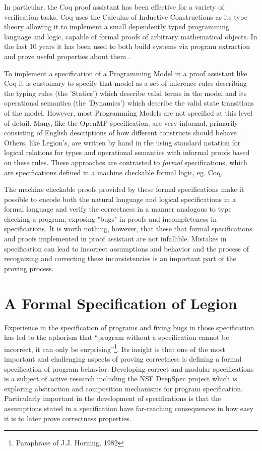 \documentclass[sigconf]{acmart}
\begin{document}
In particular, the Coq proof assistant has been effective for a variety of
verification tasks. Coq uses the Calculus of Inductive Constructions as its type 
theory allowing it to implement
a small dependently typed programming language and logic, capable of  
formal proofs of arbitrary mathematical objects\cite{bertot2013interactive}. In the last 10
years it has been used to both build systems via program extraction and prove
useful properties about them \cite{leroy2012compcert, anand2017certicoq,
chlipala2009effective}. 

To implement a specification of a Programming Model in a proof assistant like
Coq it is customary to specify that model as a set of inference rules describing
the typing rules (the 'Statics') which describe valid terms in the model and its
operational semantics (the 'Dynamics') which describe the valid state
transitions of the model. However, most Programming Models are not specified at
this level of detail. Many, like the OpenMP
specification, are very informal, primarily consisting of English descriptions
of how different constructs should behave \cite{dagum1998openmp}. Others, like
Legion's, are written by hand in the using standard notation for logical
relations for types and operational semantics with informal proofs based on these
rules. These approaches are contrasted to \emph{formal} specifications, 
which are specifications defined in a machine checkable formal logic, eg. Coq. 

The machine checkable proofs provided by these formal specifications make it
possible to encode both the natural language and logical specifications in a
formal language and verify the correctness in a manner analogous to type checking a program, exposing "bugs" in 
proofs and incompleteness in specifications. It is worth nothing, however, that
these that formal specifications and proofs implemented in proof assistant are
not infallible. Mistakes in specification can lead to incorrect assumptions and
behavior and the process of recognizing and correcting these inconsistencies is
an important part of the proving process.

\section{A Formal Specification of Legion}

Experience in the specification of programs and fixing bugs in those
specification has led to the aphorism that ``program without a specification cannot be incorrect, it can only be
surprising''\footnote{Paraphrase of J.J. Horning, 1982}. Its insight is that one
of the most
important and challenging aspects of proving correctness is defining a formal
specification of program behavior. Developing correct and modular specifications
is a subject of active research including the NSF DeepSpec
project\cite{deepspecnsf} which is exploring abstraction and composition
mechanisms for program specification. Particularly important in the development
of specifications is that the assumptions stated in a 
specification have far-reaching consequences in how easy it is to later prove
correctness properties. 
\end{document}
